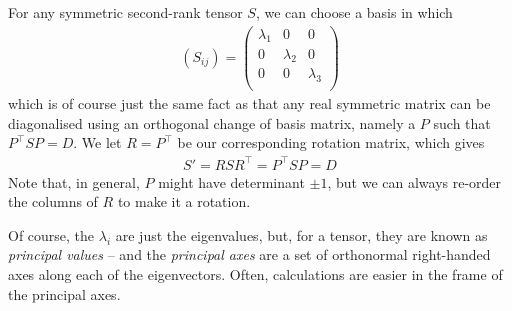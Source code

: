 \documentclass{../template/note}
\begin{document}
    For any symmetric second-rank tensor \(S\), we can choose a basis in which
    \begin{align*}
        (S_{ij}) = \begin{pmatrix}
            \lambda_1 & 0 & 0 \\
            0 & \lambda_2 & 0 \\
            0 & 0 & \lambda_3 \\
        \end{pmatrix}
    \end{align*}
    which is of course just the same fact as that any real symmetric matrix can be diagonalised using an orthogonal change of basis matrix, namely a \(P\) such that \(P^\intercal SP =D\). We let \(R = P^\intercal\) be our corresponding rotation matrix, which gives
    \begin{align*}
        S' = RSR^\intercal = P^\intercal SP = D
    \end{align*}
    Note that, in general, \(P\) might have determinant \(\pm 1\), but we can always re-order the columns of \(R\) to make it a rotation.

    Of course, the \(\lambda_i\) are just the eigenvalues, but, for a tensor, they are known as \emph{principal values} -- and the \emph{principal axes} are a set of orthonormal right-handed axes along each of the eigenvectors. Often, calculations are easier in the frame of the principal axes.
\end{document}
